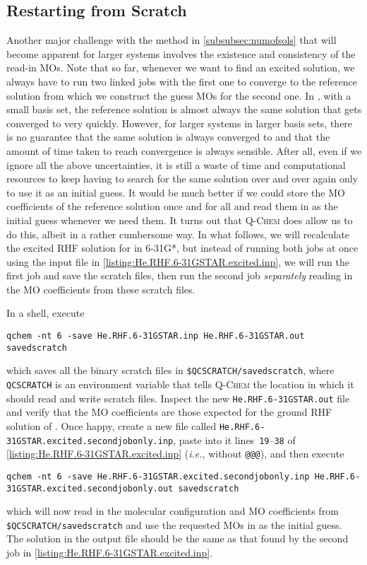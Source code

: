		
		\subsection{Restarting from Scratch}
			
			Another major challenge with the method in \cref{subsubsec:numofsols} that will become apparent for larger systems involves the existence and consistency of the read-in MOs.
			Note that so far, whenever we want to find an excited solution, we always have to run two linked jobs with the first one to converge to the reference solution from which we construct the guess MOs for the second one.
			In , with a small basis set, the reference solution is almost always the same solution that gets converged to very quickly.
			However, for larger systems in larger basis sets, there is no guarantee that the same solution is always converged to and that the amount of time taken to reach convergence is always sensible.
			After all, even if we ignore all the above uncertainties, it is still a waste of time and computational resources to keep having to search for the same solution over and over again only to use it as an initial guess.
			It would be much better if we could store the MO coefficients of the reference solution once and for all and read them in as the initial guess whenever we need them.
			It turns out that \textsc{Q-Chem} does allow us to do this, albeit in a rather cumbersome way.
			In what follows, we will recalculate the excited RHF solution for  in 6-31G*, but instead of running both jobs at once using the input file in \cref{listing:He.RHF.6-31GSTAR.excited.inp}, we will run the first job and save the scratch files, then run the second job \textit{separately} reading in the MO coefficients from these scratch files.
			
			In a shell, execute
				\begin{lstlisting}[style = custombash]
					qchem -nt 6 -save He.RHF.6-31GSTAR.inp He.RHF.6-31GSTAR.out savedscratch
				\end{lstlisting}
			which saves all the binary scratch files in \texttt{\$QCSCRATCH/savedscratch}, where \texttt{QCSCRATCH} is an environment variable that tells \textsc{Q-Chem} the location in which it should read and write scratch files.
			Inspect the new \texttt{He.RHF.6-31GSTAR.out} file and verify that the MO coefficients are those expected for the ground RHF solution of .
			Once happy, create a new file called \texttt{He.RHF.6-31GSTAR.excited.secondjobonly.inp}, paste into it lines~\texttt{19}--\texttt{38} of \cref{listing:He.RHF.6-31GSTAR.excited.inp} (\textit{i.e.}, without \texttt{@@@}), and then execute
				\begin{lstlisting}[style = custombash]
					qchem -nt 6 -save He.RHF.6-31GSTAR.excited.secondjobonly.inp He.RHF.6-31GSTAR.excited.secondjobonly.out savedscratch
				\end{lstlisting}
			which will now read in the molecular configuration and MO coefficients from \texttt{\$QCSCRATCH/savedscratch} and use the requested MOs in  as the initial guess.
			The solution in the output file should be the same as that found by the second job in \cref{listing:He.RHF.6-31GSTAR.excited.inp}.